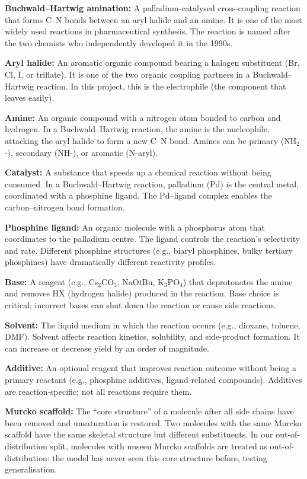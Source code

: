 \documentclass[11pt,a4paper]{article}
\begin{document}
\noindent\textbf{Buchwald--Hartwig amination:} A palladium-catalysed cross-coupling
reaction that forms C--N bonds between an aryl halide and an amine. It is one of
the most widely used reactions in pharmaceutical synthesis. The reaction is
named after the two chemists who independently developed it in the 1990s.

\noindent\textbf{Aryl halide:} An aromatic organic compound bearing a halogen
substituent (Br, Cl, I, or triflate). It is one of the two organic coupling
partners in a Buchwald--Hartwig reaction. In this project, this is the
electrophile (the component that leaves easily).

\noindent\textbf{Amine:} An organic compound with a nitrogen atom bonded to carbon
and hydrogen. In a Buchwald--Hartwig reaction, the amine is the nucleophile,
attacking the aryl halide to form a new C--N bond. Amines can be primary
(NH$_2$-), secondary (NH-), or aromatic (N-aryl).

\noindent\textbf{Catalyst:} A substance that speeds up a chemical reaction without
being consumed. In a Buchwald--Hartwig reaction, palladium (Pd) is the central
metal, coordinated with a phosphine ligand. The Pd--ligand complex enables the
carbon--nitrogen bond formation.

\noindent\textbf{Phosphine ligand:} An organic molecule with a phosphorus atom
that coordinates to the palladium centre. The ligand controls the reaction's
selectivity and rate. Different phosphine structures (e.g., biaryl phosphines,
bulky tertiary phosphines) have dramatically different reactivity profiles.

\noindent\textbf{Base:} A reagent (e.g., Cs$_2$CO$_3$, NaO$t$Bu, K$_3$PO$_4$)
that deprotonates the amine and removes HX (hydrogen halide) produced in the
reaction. Base choice is critical; incorrect bases can shut down the reaction
or cause side reactions.

\noindent\textbf{Solvent:} The liquid medium in which the reaction occurs
(e.g., dioxane, toluene, DMF). Solvent affects reaction kinetics, solubility,
and side-product formation. It can increase or decrease yield by an order of
magnitude.

\noindent\textbf{Additive:} An optional reagent that improves reaction outcome
without being a primary reactant (e.g., phosphine additives, ligand-related
compounds). Additives are reaction-specific; not all reactions require them.

\noindent\textbf{Murcko scaffold:} The ``core structure'' of a molecule after
all side chains have been removed and unsaturation is restored. Two molecules
with the same Murcko scaffold have the same skeletal structure but different
substituents. In our out-of-distribution split, molecules with unseen Murcko
scaffolds are treated as out-of-distribution: the model has never seen this
core structure before, testing generalisation.
\end{document}
